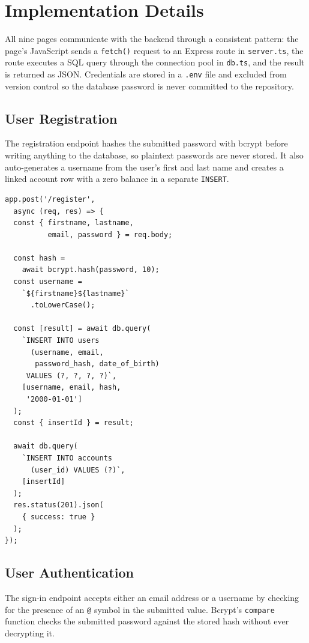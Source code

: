 \documentclass[sigconf,nonacm]{acmart}
\begin{document}
\section{Implementation Details}

All nine pages communicate with the backend through a consistent
pattern: the page's JavaScript sends a \texttt{fetch()} request to an
Express route in \texttt{server.ts}, the route executes a SQL query
through the connection pool in \texttt{db.ts}, and the result is
returned as JSON. Credentials are stored in a \texttt{.env} file and
excluded from version control so the database password is never
committed to the repository.

\subsection{User Registration}
The registration endpoint hashes the submitted password with bcrypt
before writing anything to the database, so plaintext passwords are
never stored. It also auto-generates a username from the user's first
and last name and creates a linked account row with a zero balance in a
separate \texttt{INSERT}.

\begin{verbatim}
app.post('/register',
  async (req, res) => {
  const { firstname, lastname,
          email, password } = req.body;

  const hash =
    await bcrypt.hash(password, 10);
  const username =
    `${firstname}${lastname}`
      .toLowerCase();

  const [result] = await db.query(
    `INSERT INTO users
      (username, email,
       password_hash, date_of_birth)
     VALUES (?, ?, ?, ?)`,
    [username, email, hash,
     '2000-01-01']
  );
  const { insertId } = result;

  await db.query(
    `INSERT INTO accounts
      (user_id) VALUES (?)`,
    [insertId]
  );
  res.status(201).json(
    { success: true }
  );
});
\end{verbatim}

\subsection{User Authentication}
The sign-in endpoint accepts either an email address or a username
by checking for the presence of an \texttt{@} symbol in the submitted
value. Bcrypt's \texttt{compare} function checks the submitted password
against the stored hash without ever decrypting it.
\end{document}

